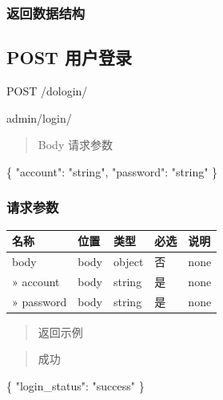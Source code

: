 \documentclass[
]{article}
\newenvironment{Shaded}{}{}
\newcommand{\DataTypeTok}[1]{\textcolor[rgb]{0.56,0.13,0.00}{#1}}
\newcommand{\FunctionTok}[1]{\textcolor[rgb]{0.02,0.16,0.49}{#1}}
\newcommand{\StringTok}[1]{\textcolor[rgb]{0.25,0.44,0.63}{#1}}
\begin{document}
\hypertarget{ux8fd4ux56deux6570ux636eux7ed3ux6784-14}{%
\subsubsection{返回数据结构}\label{ux8fd4ux56deux6570ux636eux7ed3ux6784-14}}

\hypertarget{post-ux7528ux6237ux767bux5f55}{%
\subsection{POST 用户登录}\label{post-ux7528ux6237ux767bux5f55}}

POST /dologin/

admin/login/

\begin{quote}
Body 请求参数
\end{quote}

\begin{Shaded}
\begin{Highlighting}[]
\FunctionTok{\{}
  \DataTypeTok{"account"}\FunctionTok{:} \StringTok{"string"}\FunctionTok{,}
  \DataTypeTok{"password"}\FunctionTok{:} \StringTok{"string"}
\FunctionTok{\}}
\end{Highlighting}
\end{Shaded}

\hypertarget{ux8bf7ux6c42ux53c2ux6570-19}{%
\subsubsection{请求参数}\label{ux8bf7ux6c42ux53c2ux6570-19}}

\begin{longtable}[]{@{}lllll@{}}
\toprule
名称 & 位置 & 类型 & 必选 & 说明 \\
\midrule
\endhead
body & body & object & 否 & none \\
» account & body & string & 是 & none \\
» password & body & string & 是 & none \\
\bottomrule
\end{longtable}

\begin{quote}
返回示例
\end{quote}

\begin{quote}
成功
\end{quote}

\begin{Shaded}
\begin{Highlighting}[]
\FunctionTok{\{}
  \DataTypeTok{"login\_status"}\FunctionTok{:} \StringTok{"success"}
\FunctionTok{\}}
\end{Highlighting}
\end{Shaded}
\end{document}
